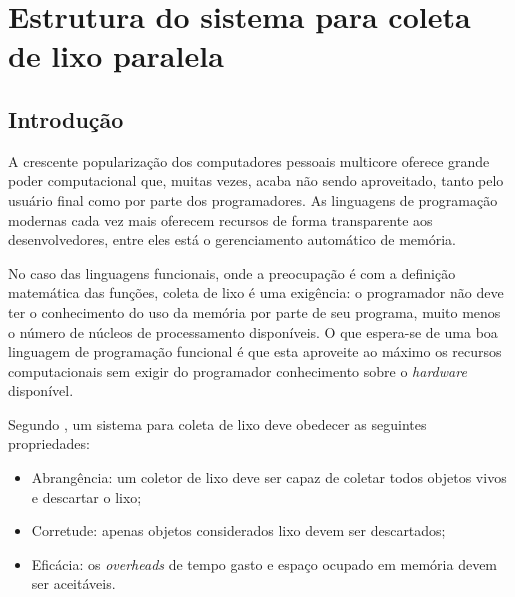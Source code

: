 \documentclass[ccc, pg2]{esinucpel}
\begin{document}


\chapter{Estrutura do sistema para coleta de lixo paralela} \label{ch:paralgo}

\section{Introdução}
A crescente popularização dos computadores pessoais multicore oferece grande poder computacional que, muitas vezes, acaba não sendo aproveitado, tanto pelo usuário final como por parte dos programadores. As linguagens de programação modernas cada vez mais oferecem recursos de forma transparente aos desenvolvedores, entre eles está o gerenciamento automático de memória.

No caso das linguagens funcionais, onde a preocupação é com a definição matemática das funções, coleta de lixo é uma exigência: o programador não deve ter o conhecimento do uso da memória por parte de seu programa, muito menos o número de núcleos de processamento disponíveis. O que espera-se de uma boa linguagem de programação funcional é que esta aproveite ao máximo os recursos computacionais sem exigir do programador conhecimento sobre o {\it hardware} disponível. %

Segundo \cite{bib:lins:gc}, um sistema para coleta de lixo deve obedecer as seguintes propriedades:
\begin{itemize} %
\item Abrangência: um coletor de lixo deve ser capaz de coletar todos objetos vivos e descartar o lixo;

\item Corretude: apenas objetos considerados lixo devem ser descartados;

\item Eficácia: os {\it overheads} de tempo gasto e espaço ocupado em memória devem ser aceitáveis.
\end{itemize}
\end{document}
